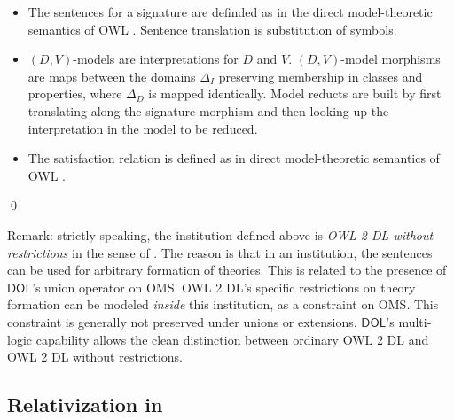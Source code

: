 \documentclass[10pt,fleqn,final]{scrreprt}
\newcommand*{\DOL}{\ensuremath{\mathsf{DOL}}\xspace}
\newcommand{\ssclause}[1]{\subsection{#1}}
\newenvironment{definitions}[0]{\medskip }{}
\providecommand{\DIFaddbegin}{} %
\begin{document}
\begin{definitions}
\begin{definition}
\begin{itemize}
\begin{itemize}
\end{itemize}
\item The sentences for a signature are definded as in
the direct model-theoretic semantics of OWL \cite{w3c:owl2-direct-semantics}. Sentence translation is substitution of symbols.
\item  $(D,V)$-models are interpretations for $D$ and $V$. 
$(D,V)$-model morphisms are maps between the domains $\Delta_I$ preserving membership in classes and properties, where $\Delta_D$ is mapped identically. Model reducts are built by first translating along the signature morphism and then
looking up the interpretation in the model to be reduced.  
\item The satisfaction relation is defined as in direct model-theoretic semantics of OWL \cite{w3c:owl2-direct-semantics}.
\end{itemize}
\qed\end{definition}





Remark: strictly speaking, the institution defined above is
\emph{{OWL} 2 DL without restrictions} in the sense of
\cite{DBLP:conf/owled/SchneiderRS13}. The reason is that in an
institution, the sentences can be used for arbitrary formation of
theories. This is related to the presence of \DOL's union operator on
OMS.  OWL 2 DL's specific restrictions on theory formation can be
modeled \emph{inside} this institution, as a constraint on OMS.  This
constraint is generally not preserved under unions or
extensions. \DOL's multi-logic capability allows the clean distinction
between ordinary OWL 2 DL and {OWL} 2 DL without restrictions.

\DIFaddbegin \ssclause{Relativization in \OWL}


\end{definitions}
\end{document}
